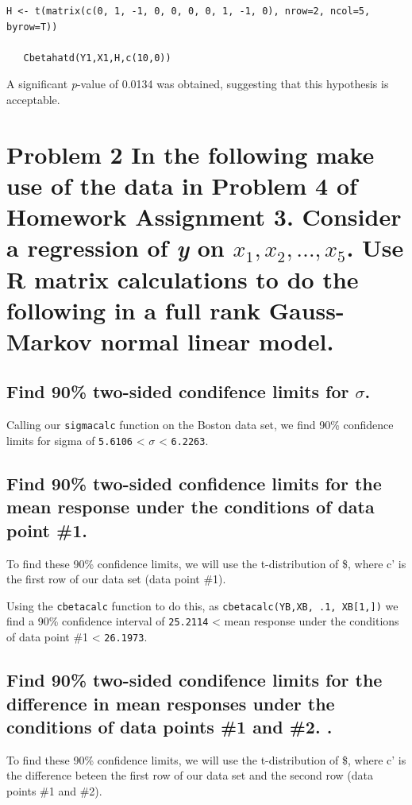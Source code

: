 \documentclass[11pt]{article}
\begin{document}
\begin{verbatim}
H <- t(matrix(c(0, 1, -1, 0, 0, 0, 0, 1, -1, 0), nrow=2, ncol=5, byrow=T))

   Cbetahatd(Y1,X1,H,c(10,0))
\end{verbatim}

A significant \emph{p}-value of 0.0134 was obtained, suggesting that this
hypothesis is acceptable.
\section{Problem 2 In the following make use of the data in Problem 4 of Homework Assignment 3. Consider a regression of \emph{y} on $x_1, x_2,\ldots,x_5$. Use R matrix calculations to do the following in a full rank Gauss-Markov normal linear model.}
\label{sec-2}
\subsection{Find 90\% two-sided condifence limits for $\sigma$.}
\label{sec-2-1}


Calling our \verb~sigmacalc~ function on the Boston data set, we find 90\%
confidence limits for sigma of
\texttt{5.6106} < $\sigma$ < \texttt{6.2263}.
\subsection{Find 90\% two-sided confidence limits for the mean response under the conditions of data point \#1.}
\label{sec-2-2}



To find these 90\% confidence limits, we will use the t-distribution
of \$, where c' is the first row of our data set
(data point \#1).

Using the \verb~cbetacalc~ function to do this, as \verb~cbetacalc(YB,XB, .1, XB[1,])~ we find a 90\% confidence interval of \texttt{25.2114} 
< mean response under the conditions of data point \#1 <
\texttt{26.1973}.
\subsection{Find 90\% two-sided condifence limits for the difference in mean responses under the conditions of data points \#1 and \#2. .}
\label{sec-2-3}



To find these 90\% confidence limits, we will use the t-distribution
of \$, where c' is the difference beteen the first row
of our data set and the second row
(data points \#1 and \#2).
\end{document}
